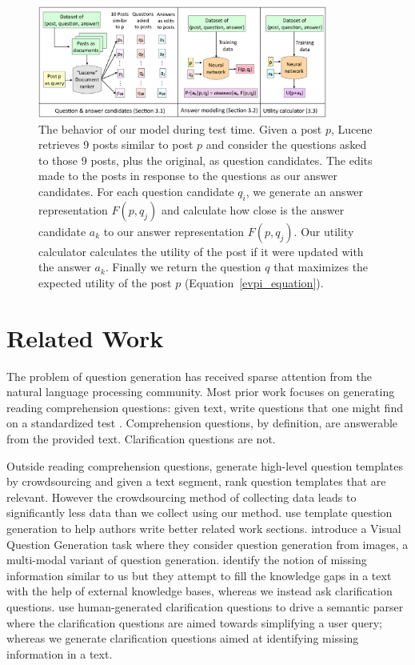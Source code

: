 \documentclass[11pt]{report}
\newcommand\newcite{\citet}
\begin{document}
\begin{figure}[t]
\centering
\includegraphics[width=0.85\textwidth]{model}
\caption{\small The behavior of our model during test time. Given a post $p$, Lucene retrieves 9 posts similar to post $p$ and consider the questions asked to those 9 posts, plus the original, as question candidates. The edits made to the posts in response to the questions as our answer candidates. For each question candidate $q_i$, we generate an answer representation $F(p,q_j)$ and calculate how close is the answer candidate $a_k$ to our answer representation $F(p,q_j)$. Our utility calculator calculates the utility of the post if it were updated with the answer $a_k$. Finally we return the question $q$ that maximizes the expected utility of the post $p$ (Equation~\ref{evpi_equation}).}
\label{model}
\end{figure}

\section{Related Work} \label{related_work}

The problem of question generation has received sparse attention from the natural language processing community. Most prior work focuses on generating reading comprehension questions:  given text, write questions that one might find on a standardized test \cite{vanderwende2008importance,heilman2011automatic,rus2011question,olney2012question}.  Comprehension questions, by definition, are answerable from the provided text. Clarification questions are not.  

Outside reading comprehension questions, \newcite{labutov2015deep} generate high-level question templates by crowdsourcing and given a text segment, rank question templates that are relevant. However the crowdsourcing method of collecting data leads to significantly less data than we collect using our method. \newcite{liu2010automatic} use template question generation to help authors write better related work sections. \newcite{mostafazadeh2016generating} introduce a Visual Question Generation task where they consider question generation from images, a multi-modal variant of question generation. 
\newcite{penas2010filling} identify the notion of missing information similar to us but they attempt to fill the knowledge gaps in a text with the help of external knowledge bases, whereas we instead ask clarification questions. \newcite{artzi2011bootstrapping} use human-generated clarification questions to drive a semantic parser where the clarification questions are aimed towards simplifying a user query; whereas we generate clarification questions aimed at  identifying missing information in a text. 
\end{document}
